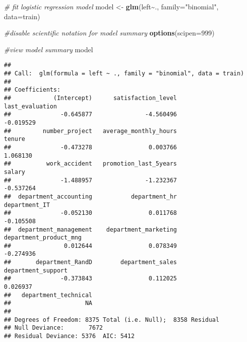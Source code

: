 \documentclass[
]{article}
\newenvironment{Shaded}{\begin{snugshade}}{\end{snugshade}}
\newcommand{\AttributeTok}[1]{\textcolor[rgb]{0.13,0.29,0.53}{#1}}
\newcommand{\CommentTok}[1]{\textcolor[rgb]{0.56,0.35,0.01}{\textit{#1}}}
\newcommand{\DecValTok}[1]{\textcolor[rgb]{0.00,0.00,0.81}{#1}}
\newcommand{\FloatTok}[1]{\textcolor[rgb]{0.00,0.00,0.81}{#1}}
\newcommand{\FunctionTok}[1]{\textcolor[rgb]{0.13,0.29,0.53}{\textbf{#1}}}
\newcommand{\NormalTok}[1]{#1}
\newcommand{\OtherTok}[1]{\textcolor[rgb]{0.56,0.35,0.01}{#1}}
\newcommand{\SpecialCharTok}[1]{\textcolor[rgb]{0.81,0.36,0.00}{\textbf{#1}}}
\newcommand{\StringTok}[1]{\textcolor[rgb]{0.31,0.60,0.02}{#1}}
\begin{document}
\begin{Shaded}
\end{Shaded}

\begin{Shaded}
\begin{Highlighting}[]
\CommentTok{\# fit logistic regression model}
\NormalTok{model }\OtherTok{\textless{}{-}} \FunctionTok{glm}\NormalTok{(left}\SpecialCharTok{\textasciitilde{}}\NormalTok{., }\AttributeTok{family=}\StringTok{"binomial"}\NormalTok{, }\AttributeTok{data=}\NormalTok{train)}

\CommentTok{\#disable scientific notation for model summary}
\FunctionTok{options}\NormalTok{(}\AttributeTok{scipen=}\DecValTok{999}\NormalTok{)}

\CommentTok{\#view model summary}
\NormalTok{model}
\end{Highlighting}
\end{Shaded}

\begin{verbatim}
## 
## Call:  glm(formula = left ~ ., family = "binomial", data = train)
## 
## Coefficients:
##            (Intercept)      satisfaction_level         last_evaluation  
##              -0.645877               -4.560496               -0.019529  
##         number_project   average_monthly_hours                  tenure  
##              -0.473278                0.003766                1.068130  
##          work_accident   promotion_last_5years                  salary  
##              -1.488957               -1.232367               -0.537264  
##  department_accounting           department_hr           department_IT  
##              -0.052130                0.011768               -0.105508  
##  department_management    department_marketing  department_product_mng  
##               0.012644                0.078349               -0.274936  
##       department_RandD        department_sales      department_support  
##              -0.373843                0.112025                0.026937  
##   department_technical  
##                     NA  
## 
## Degrees of Freedom: 8375 Total (i.e. Null);  8358 Residual
## Null Deviance:       7672 
## Residual Deviance: 5376  AIC: 5412
\end{verbatim}
\end{document}
